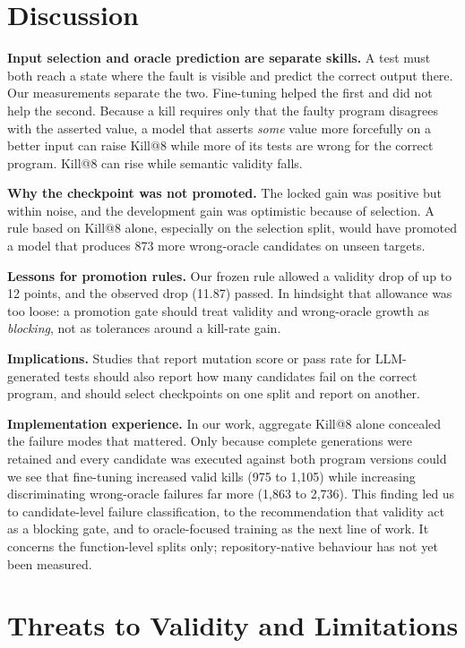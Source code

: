 \documentclass[conference,a4paper]{IEEEtran}
\makeatletter
\newcommand{\killk}[1]{Kill@#1}
\makeatother
\begin{document}
\section{Discussion}

\textbf{Input selection and oracle prediction are separate skills.} A test must both
reach a state where the fault is visible and predict the correct output there. Our
measurements separate the two. Fine-tuning helped the first and did not help the
second. Because a kill requires only that the faulty program disagrees with the
asserted value, a model that asserts \emph{some} value more forcefully on a better
input can raise \killk{8} while more of its tests are wrong for the correct program.
\killk{8} can rise while semantic validity falls.

\textbf{Why the checkpoint was not promoted.} The locked gain was positive but within
noise, and the development gain was optimistic because of selection. A rule based on
\killk{8} alone, especially on the selection split, would have promoted a model that
produces 873 more wrong-oracle candidates on unseen targets.

\textbf{Lessons for promotion rules.} Our frozen rule allowed a validity drop of up to
12 points, and the observed drop (11.87) passed. In hindsight that allowance was too
loose: a promotion gate should treat validity and wrong-oracle growth as
\emph{blocking}, not as tolerances around a kill-rate gain.

\textbf{Implications.} Studies that report mutation score or pass rate for
LLM-generated tests should also report how many candidates fail on the correct
program, and should select checkpoints on one split and report on another.

\textbf{Implementation experience.} In our work, aggregate \killk{8} alone concealed
the failure modes that mattered. Only because complete generations were retained and
every candidate was executed against both program versions could we see that
fine-tuning increased valid kills (975 to 1,105) while increasing discriminating
wrong-oracle failures far more (1,863 to 2,736). This finding led us to candidate-level
failure classification, to the recommendation that validity act as a blocking gate,
and to oracle-focused training as the next line of work. It concerns the
function-level splits only; repository-native behaviour has not yet been measured.

\section{Threats to Validity and Limitations}
\label{sec:threats}
\end{document}

